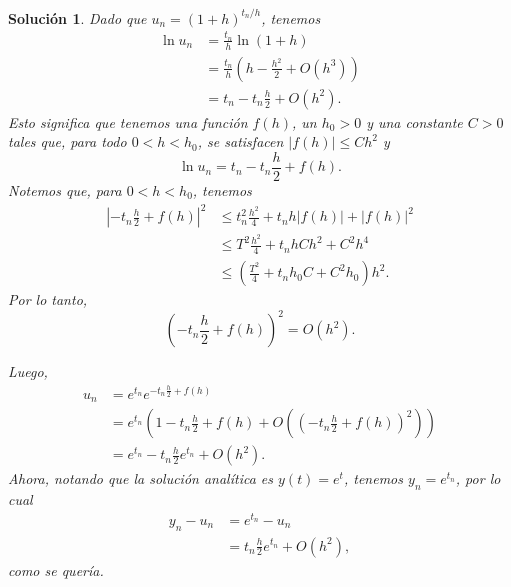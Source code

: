 \documentclass[11pt]{article}
\newtheorem*{sol}{Solución}
\begin{document}
\begin{sol}
  Dado que $u_n=(1+h)^{t_n/h}$, tenemos
  \begin{align}
    \ln u_n 
    &= \frac{t_n}{h}\ln(1+h) \\
    &= \frac{t_n}{h}\left(h-\frac{h^{2}}{2} + O(h^{3})\right) \\
    &= t_n - t_n \frac{h}{2} + O(h^{2})
  .\end{align}
  Esto significa que tenemos una función $f(h)$, un $h_0>0$ y una
  constante $C>0$ tales que, para todo $0<h<h_0$, se satisfacen
  $|f(h)|\leq Ch^{2}$ y
  \begin{equation}
    \ln u_n = t_n - t_n \frac{h}{2} + f(h)
  .\end{equation}
  Notemos que, para $0<h<h_0$, tenemos
  \begin{align}
     \left| -t_n \frac{h}{2} + f(h) \right|^{2}
     &\leq t_n^{2} \frac{h^{2}}{4} + t_n h |f(h)| + |f(h)|^{2} \\
     &\leq T^{2} \frac{h^{2}}{4} + t_n h Ch^{2} + C^{2}h^{4} \\
     &\leq \left(\frac{T^{2}}{4} + t_n h_0 C + C^{2}h_0 \right)h^{2}
  .\end{align}
  Por lo tanto,
  \begin{equation}
     \left( -t_n \frac{h}{2} + f(h) \right)^{2}
     = O(h^{2})
  .\end{equation}
  
   
  Luego,
  \begin{align}
    u_n
    &= e^{t_n}e^{-t_n \frac{h}{2} + f(h)} \\
    &= e^{t_n}
        \left(1
         -t_n \frac{h}{2} + f(h)
         + O\left(\left(
         -t_n \frac{h}{2} + f(h)
         \right)^{2}
         \right)
      \right) \\
    &= 
        e^{t_n}
         -t_n \frac{h}{2}e^{t_n} + O(h^{2})
  .\end{align}
  Ahora, notando que la solución analítica es $y(t)=e^{t}$, tenemos
  $y_n=e^{t_n}$, por lo cual
  \begin{align}
    y_n - u_n
    &= e^{t_n} - u_n \\
    &= t_n \frac{h}{2} e^{t_n} + O(h^{2})
  ,\end{align}
  como se quería.
\end{sol}
\end{document}
